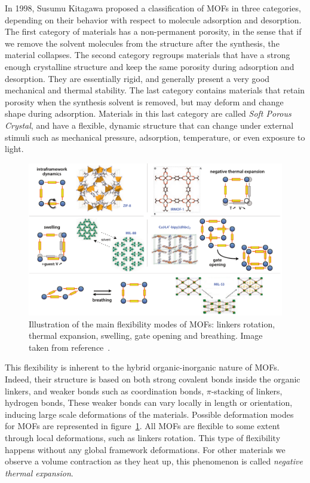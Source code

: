\documentclass[thesis]{subfiles}
\begin{document}
In 1998, Susumu Kitagawa proposed a classification of MOFs in three
categories\cite{Horike2009}, depending on their behavior with respect to
molecule adsorption and desorption. The first category of materials has a
non-permanent porosity, in the sense that if we remove the solvent molecules
from the structure after the synthesis, the material collapses. The second
category regroups materials that have a strong enough crystalline structure and
keep the same porosity during adsorption and desorption. They are essentially
rigid, and generally present a very good mechanical and thermal stability. The
last category contains materials that retain porosity when the synthesis solvent
is removed, but may deform and change shape during adsorption. Materials in this
last category are called \emph{Soft Porous Crystal}, and have a flexible,
dynamic structure that can change under external stimuli such as mechanical
pressure, adsorption, temperature, or even exposure to light\cite{Kitagawa2005,
Coudert2015}.

\begin{figure}[ht]
    \centering
    \includegraphics[width=\textwidth]{figures/cited/mof-flexibility}
    \caption{Illustration of the main flexibility modes of MOFs: linkers
    rotation, thermal expansion, swelling, gate opening and breathing. Image
    taken from reference~\cite{Coudert2011}.}
    \label{fig:mof-flexibility}
\end{figure}

This flexibility is inherent to the hybrid organic-inorganic nature of MOFs.
Indeed, their structure is based on both strong covalent bonds inside the
organic linkers, and weaker bonds such as coordination bonds, $\pi$-stacking of
linkers, hydrogen bonds, \etc These weaker bonds can vary locally in length or
orientation, inducing large scale deformations of the materials. Possible
deformation modes for MOFs are represented in figure~\ref{fig:mof-flexibility}.
All MOFs are flexible to some extent through local deformations, such as linkers
rotation. This type of flexibility happens without any global framework
deformations. For other materials we observe a volume contraction as they heat
up, this phenomenon is called \emph{negative thermal
expansion}\cite{Dubbeldam2007}.
\end{document}
